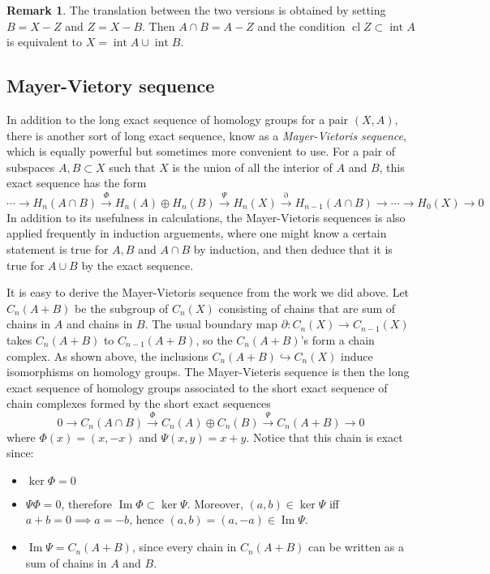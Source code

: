 \documentclass[11pt,a4paper]{article}
\theoremstyle{definition}
\newtheorem{remark}[definition]{Remark}
\theoremstyle{plain}
\theoremstyle{remark}
\begin{document}
\begin{remark}
The translation between the two versions is obtained by setting $B = X - Z$ and $Z = X - B$. Then $A \cap B = A - Z$ 
and the condition $\operatorname{cl} Z \subset \operatorname{int} A$ is equivalent to 
$X = \operatorname{int} A \cup \operatorname{int} B$. 

\subsection{Mayer-Vietory sequence}
In addition to the long exact sequence of homology groups for a pair $(X, A)$, there is another sort of long exact sequence, know as a 
\emph{Mayer-Vietoris sequence}, which is equally powerful but sometimes more convenient to use. 
For a pair of subspaces $A,B \subset X$ such that $X$ is the union of all the interior of $A$ and $B$, this exact sequence has the form  
$$\cdots \to H_n(A \cap B) \xrightarrow{\Phi} H_n (A) \oplus H_n (B) \xrightarrow{\Psi} H_n(X) \xrightarrow{\partial} H_{n-1} (A \cap B) \to \cdots \to H_0(X) \to 0$$ 
In addition to its usefulness in calculations, the Mayer-Vietoris sequences is also applied frequently in induction arguements, 
where one might know a certain statement is true for $A, B$ and $A \cap B$ by induction, and then deduce that it is true for $A \cup B$ 
by the exact sequence. 

It is easy to derive the Mayer-Vietoris sequence from the work we did above. Let $C_n(A + B)$ be the subgroup 
of $C_n(X)$ consisting of chains that are sum of chains in $A$ and chains in $B$. 
The usual boundary map $\partial \colon C_n(X) \to C_{n-1} (X)$ takes $C_n (A + B)$ to 
$C_{n-1} (A + B)$, so the $C_n(A+B)$'s form a chain complex. 
As shown above, the inclusions $C_n(A + B) \hookrightarrow C_n(X)$ induce isomorphisms on homology groups. 
The Mayer-Vieteris sequence is then the long exact sequence of homology groups associated to the short exact sequence of chain complexes formed 
by the short exact sequences 
$$0 \to C_n (A \cap B) \xrightarrow{\Phi} C_n(A) \oplus C_n(B) \xrightarrow{\Psi} C_n (A + B) \to 0$$
where $\Phi (x) = (x, -x)$ and $\Psi (x, y) = x + y$. Notice that this chain is exact since: 
\begin{itemize}
  \item $\ker \Phi = 0$ 
  \item $\Psi \Phi = 0$, therefore $\operatorname{Im} \Phi \subset \ker \Psi$. 
  Moreover, $(a, b) \in \ker \Psi$ iff $a + b = 0 \implies a = -b$, hence 
  $(a, b) = (a, -a) \in \operatorname{Im} \Psi$. 
  \item $\operatorname{Im} \Psi = C_n (A + B)$, since every chain in $C_n (A + B)$ can be written as a sum of chains in $A$ and $B$. 
\end{itemize}


\end{remark}
\end{document}
